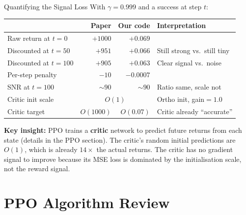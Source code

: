 \documentclass[aspectratio=169,11pt]{beamer}
\begin{document}
\begin{frame}{Quantifying the Signal Loss}
  With $\gamma = 0.999$ and a success at step $t$:

  \smallskip
  \begin{center}
  \small
  \begin{tabular}{lrrl}
    \toprule
    & \textbf{Paper} & \textbf{Our code} & \textbf{Interpretation} \\
    \midrule
    Raw return at $t{=}0$   & $+1000$   & $+0.069$    & \\
    Discounted at $t{=}50$  & $+951$    & $+0.066$    & Still strong vs.\ still tiny \\
    Discounted at $t{=}100$ & $+905$    & $+0.063$    & Clear signal vs.\ noise \\
    \midrule
    Per-step penalty         & $-10$     & $-0.0007$   & \\
    SNR at $t{=}100$         & $\sim 90$ & $\sim 90$   & Ratio same, scale not \\
    \midrule
    Critic init scale       & \multicolumn{2}{c}{$O(1)$} & Ortho init, gain${}=1.0$ \\
    Critic target           & $O(1000)$ & $O(0.07)$    & \textcolor{bad}{Critic already ``accurate''} \\
    \bottomrule
  \end{tabular}
  \end{center}

  \medskip
  \textbf{Key insight:} PPO trains a \textbf{critic} network to predict future returns from each state
  (details in the PPO section).
  The critic's random initial predictions are $O(1)$, which is
  already $14\times$ the actual returns.  The critic has no gradient signal to improve
  because its MSE loss is dominated by the initialisation scale, not the reward signal.
\end{frame}

\section{PPO Algorithm Review}
\end{document}
